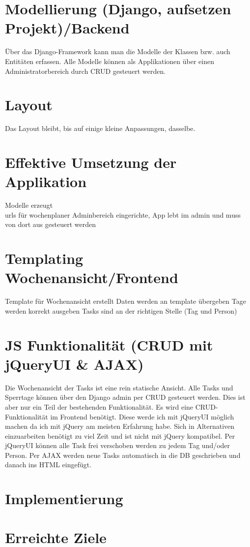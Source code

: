 
\section{Modellierung (Django, aufsetzen Projekt)/Backend }
Über das Django-Framework kann man die Modelle der Klassen bzw. auch Entitäten erfassen.
Alle Modelle können als Applikationen über einen Administratorbereich durch CRUD gesteuert werden.
\section{Layout}
Das Layout bleibt, bis auf einige kleine Anpassungen, dasselbe.
\section{Effektive Umsetzung der Applikation}
Modelle erzeugt\\
urls für wochenplaner
Adminbereich eingerichte, App lebt im admin und muss von dort aus gesteuert werden\\
\section{Templating Wochenansicht/Frontend}
Template für Wochenansicht erstellt
Daten werden an template übergeben
Tage werden korrekt ausgeben
Tasks sind an der richtigen Stelle (Tag und Person)
\section{JS Funktionalität (CRUD mit jQueryUI \& AJAX) }
Die Wochenansicht der Tasks ist eine rein statische Ansicht.
Alle Tasks und Sperrtage können über den Django admin per CRUD gesteuert werden. Dies ist aber nur ein Teil der bestehenden Funktionalität.
Es wird eine CRUD-Funktionalität im Frontend benötigt. Diese werde ich mit jQueryUI möglich machen da ich mit jQuery am meisten Erfahrung habe.
Sich in Alternativen einzuarbeiten benötigt zu viel Zeit und ist nicht mit jQuery kompatibel.
Per jQueryUI können alle Task frei verschoben werden zu jedem Tag und/oder Person.
Per AJAX werden neue Tasks automatisch in die DB geschrieben und danach ins HTML eingefügt.
\section{Implementierung}
\section{Erreichte Ziele}
